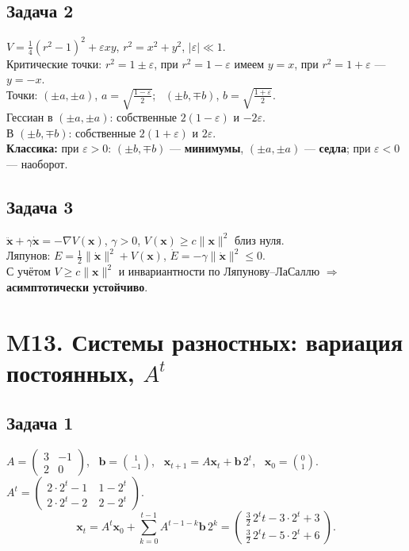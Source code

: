 \documentclass[12pt]{article}
\begin{document}
\subsection*{Задача 2}
$V=\tfrac14(r^2-1)^2+\varepsilon xy$, $r^2=x^2+y^2$, $|\varepsilon|\ll1$. \\
Критические точки: $r^2=1\pm\varepsilon$, при $r^2=1-\varepsilon$ имеем $y=x$, при $r^2=1+\varepsilon$ — $y=-x$. \\
Точки: $(\pm a,\pm a)$, $a=\sqrt{\tfrac{1-\varepsilon}{2}}$; \ $(\pm b,\mp b)$, $b=\sqrt{\tfrac{1+\varepsilon}{2}}$. \\
Гессиан в $(\pm a,\pm a)$: собственные $2(1-\varepsilon)$ и $-2\varepsilon$. \\
В $(\pm b,\mp b)$: собственные $2(1+\varepsilon)$ и $2\varepsilon$. \\
\textbf{Классика: } при $\varepsilon>0$: $(\pm b,\mp b)$ — \textbf{минимумы}, $(\pm a,\pm a)$ — \textbf{седла}; при $\varepsilon<0$ — наоборот.

\subsection*{Задача 3}
$\ddot{\mathbf x}+\gamma\dot{\mathbf x}=-\nabla V(\mathbf x)$, $\gamma>0$, $V(\mathbf x)\ge c\|\mathbf x\|^2$ близ нуля. \\
Ляпунов: $E=\tfrac12\|\dot{\mathbf x}\|^2+V(\mathbf x)$, $\dot E=-\gamma\|\dot{\mathbf x}\|^2\le0$. \\
С учётом $V\ge c\|\mathbf x\|^2$ и инвариантности по Ляпунову–ЛаСаллю $\Rightarrow$ \textbf{асимптотически устойчиво}.

\section*{M13. Системы разностных: вариация постоянных, $A^t$}

\subsection*{Задача 1}
$A=\begin{pmatrix}3&-1\\2&0\end{pmatrix}$, \ $\mathbf b=\binom{1}{-1}$, \ $\mathbf x_{t+1}=A\mathbf x_t+\mathbf b\,2^t$, \ $\mathbf x_0=\binom{0}{1}$. \\
$A^t=\begin{pmatrix}2\cdot2^t-1&\ 1-2^t\\[2pt]2\cdot2^t-2&\ 2-2^t\end{pmatrix}$. \\
\[
\mathbf x_t=A^t\mathbf x_0+\sum_{k=0}^{t-1}A^{t-1-k}\mathbf b\,2^k
=\binom{\frac{3}{2}\,2^t t-3\cdot 2^t+3}{\ \frac{3}{2}\,2^t t-5\cdot 2^t+6\ }.
\]
\end{document}

